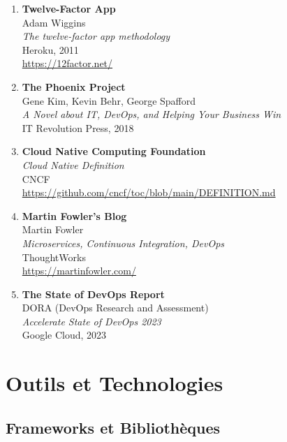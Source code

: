 \begin{enumerate}
    \item \textbf{Twelve-Factor App} \\
    Adam Wiggins \\
    \textit{The twelve-factor app methodology} \\
    Heroku, 2011 \\
    \url{https://12factor.net/}

    \item \textbf{The Phoenix Project} \\
    Gene Kim, Kevin Behr, George Spafford \\
    \textit{A Novel about IT, DevOps, and Helping Your Business Win} \\
    IT Revolution Press, 2018

    \item \textbf{Cloud Native Computing Foundation} \\
    \textit{Cloud Native Definition} \\
    CNCF \\
    \url{https://github.com/cncf/toc/blob/main/DEFINITION.md}

    \item \textbf{Martin Fowler's Blog} \\
    Martin Fowler \\
    \textit{Microservices, Continuous Integration, DevOps} \\
    ThoughtWorks \\
    \url{https://martinfowler.com/}

    \item \textbf{The State of DevOps Report} \\
    DORA (DevOps Research and Assessment) \\
    \textit{Accelerate State of DevOps 2023} \\
    Google Cloud, 2023
\end{enumerate}

\section{Outils et Technologies}

\subsection{Frameworks et Bibliothèques}


